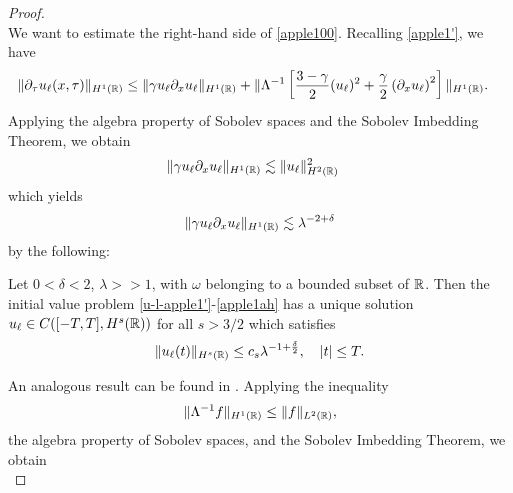 \begin{proof}
\begin{equation}
\end{equation}
%
%
We want to estimate the right-hand side of \eqref{apple100}. Recalling
\eqref{apple1'}, we have
%
%
\begin{equation}
\label{apple101}
\begin{split}
\|\partial_\tau u_\ell(x,\tau) \|_{H^1(\mathbb{R})}
& \le \|\gamma u_\ell \partial_x u_\ell \|_{H^1(\mathbb{R})}
+ \|\Lambda^{-1} \left[
\frac{3-\gamma}{2} (u_\ell)^2 + \frac{\gamma}{2} \left( \partial_x u_\ell 
\right)^2
\right] \|_{H^1(\mathbb{R})}.
\end{split}
\end{equation}
%
%
Applying the algebra property of Sobolev spaces and the Sobolev Imbedding 
Theorem, we obtain
%
%
\begin{equation*}
\begin{split}
\|\gamma u_\ell \partial_x u_\ell \|_{H^1(\mathbb{R})} &
\lesssim \|u_\ell\|_{H^2(\mathbb{R})}^2
\end{split}
\end{equation*}
%
%
which yields 
%
%
\begin{equation}
\begin{split}
\|\gamma u_\ell \partial_x u_\ell \|_{H^1(\mathbb{R})} \lesssim \lambda^{-2 + \delta}
\label{apple102}
\end{split}
\end{equation}
%
%
%
%
by the following:
%
%
%
%
%
% 				
%
%
%
%
%
\begin{lemma}
\label{appleb}
Let $0<\delta<2$, $\lambda >>1$, with $\omega$ belonging to a bounded
subset of $\mathbb{R}$. Then the initial value problem
\eqref{u-l-apple1'}-\eqref{apple1ah}
has a unique solution
$u_\ell \in C( [-T,T], H^s(\mathbb{R}))$ for all $s
> 3/2$ which satisfies
%
%
\begin{equation}
\label{apple10'}
\|u_\ell(t)\|_{H^s(\mathbb{R})} \le c_s \lambda^{-1 +
\frac{\delta}{2}}, \quad |t| \le T.
\end{equation}
%
%
\end{lemma}
%
An analogous result can be found in \cite{Himonas:2009fk}. 
%
%
%
Applying the inequality %
%
\begin{equation*}
\begin{split}
\|\Lambda^{-1} f \|_{H^1(\mathbb{R})} \le \|f\|_{L^2(\mathbb{R})},
\label{apple27}
\end{split}
\end{equation*}
%
%
the algebra property of Sobolev spaces, and
the Sobolev Imbedding Theorem, we obtain
%
%
\begin{equation*}

\end{equation*}
\end{proof}
